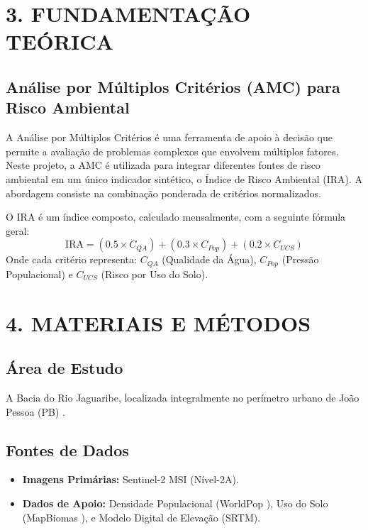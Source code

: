 \documentclass[12pt, a4paper]{article}
\begin{document}
\section*{3. FUNDAMENTAÇÃO TEÓRICA}
\subsection{Análise por Múltiplos Critérios (AMC) para Risco Ambiental}
A Análise por Múltiplos Critérios é uma ferramenta de apoio à decisão que permite a avaliação de problemas complexos que envolvem múltiplos fatores. Neste projeto, a AMC é utilizada para integrar diferentes fontes de risco ambiental em um único indicador sintético, o Índice de Risco Ambiental (IRA). A abordagem consiste na combinação ponderada de critérios normalizados.

O IRA é um índice composto, calculado mensalmente, com a seguinte fórmula geral:
\begin{equation}
    \text{IRA} = (0.5 \times C_{QA}) + (0.3 \times C_{Pop}) + (0.2 \times C_{UCS})
\end{equation}
Onde cada critério representa: $C_{QA}$ (Qualidade da Água), $C_{Pop}$ (Pressão Populacional) e $C_{UCS}$ (Risco por Uso do Solo).

\section*{4. MATERIAIS E MÉTODOS}
\subsection{Área de Estudo}
A Bacia do Rio Jaguaribe, localizada integralmente no perímetro urbano de João Pessoa (PB) \cite{santos2016}.

\subsection{Fontes de Dados}
\begin{itemize}
    \item \textbf{Imagens Primárias:} Sentinel-2 MSI (Nível-2A).
    \item \textbf{Dados de Apoio:} Densidade Populacional (WorldPop \cite{worldpop2020}), Uso do Solo (MapBiomas \cite{mapbiomas2021}), e Modelo Digital de Elevação (SRTM).
\end{itemize}
\end{document}
